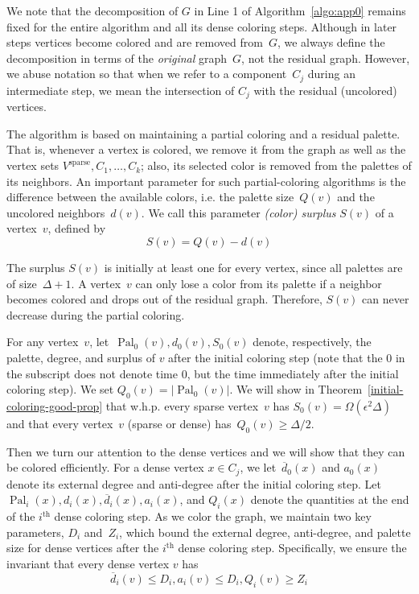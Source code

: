 \documentclass[11pt]{amsart}
\newcommand{\pal}{\operatorname{Pal}}
\newcommand{\extd}{\ensuremath{{\overline{d}}}}
\begin{document}
We note that the decomposition of $G$ in Line 1 of Algorithm~\ref{algo:app0} remains fixed for the entire algorithm and all its dense coloring steps. Although in later steps vertices become colored and are removed from~$G$, we always define the decomposition in terms of the \emph{original} graph~$G$, not the residual graph. However, we abuse notation so that when we refer to a component~$C_j$ during an intermediate step, we mean the intersection of $C_j$ with the residual (uncolored) vertices. 

The algorithm is based on maintaining a partial coloring and a residual palette. That is, whenever a vertex is colored, we remove it from the graph as well as the vertex sets $V^{\text{sparse}}, C_1, \ldots ,C_k$; also, its selected color is removed from the palettes of its neighbors. An important parameter for such partial-coloring algorithms is the difference between the available colors, i.e. the palette size~$Q(v)$ and the uncolored neighbors~$d(v)$. We call this parameter \emph{(color) surplus} $S(v)$ of a vertex~$v$, defined by
$$
S(v) = Q(v) - d(v)
$$

The surplus $S(v)$ is initially at least one for every vertex, since all palettes are of size~$\Delta+1$. A vertex~$v$ can only lose a color from its palette if a neighbor becomes colored and drops out of the residual graph. Therefore, $S(v)$ can never decrease during the partial coloring.

For any vertex~$v$, let~$\pal_0(v), d_0(v), S_0(v)$ denote, respectively, the palette,  degree, and surplus of $v$ after the initial coloring step (note that the 0 in the subscript does not denote time 0, but the time immediately after the initial coloring step). We set $Q_0(v) = |\pal_0(v)|$. We will show in Theorem~\ref{initial-coloring-good-prop} that w.h.p. every sparse vertex~$v$ has $S_0(v) = \Omega(\epsilon^2 \Delta)$ and that every vertex~$v$ (sparse or dense) has~$Q_0(v) \geq \Delta /2$.

Then we turn our attention to the dense vertices and we will show that they can be colored efficiently. For a dense vertex $x \in C_j$, we let~$\extd_0(x)$ and $a_0(x)$ denote its external degree and anti-degree after the initial coloring step. Let $\pal_i(x), d_i(x), \extd_i(x), a_i(x)$, and $Q_i(x)$ denote the quantities at the end of the $i^{\text{th}}$ dense coloring step. As we color the graph, we maintain two key parameters, $D_i$ and~$Z_i$, which bound the external degree, anti-degree, and palette size for dense vertices after the $i^{\text{th}}$ dense coloring step. Specifically, we ensure the invariant that every dense vertex $v$ has
$$
\extd_i(v) \leq D_i, a_i(v) \leq D_i, Q_i(v) \geq Z_i
$$
\end{document}
